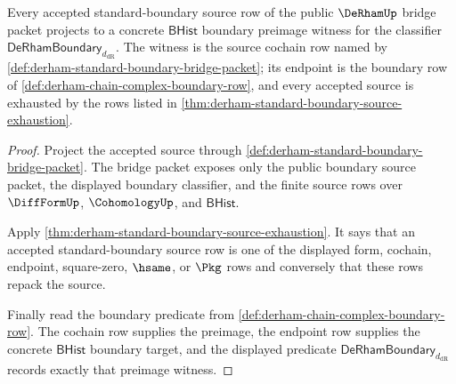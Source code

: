 \begin{theorem}
\label{thm:derham-root-boundary-preimage-threshold}
Every accepted standard-boundary source row of the public $\DeRhamUp$ bridge
packet projects to a concrete $\mathsf{BHist}$ boundary preimage witness for
the classifier $\mathsf{DeRhamBoundary}_{d_{\mathrm{dR}}}$. The witness is the
source cochain row named by
\autoref{def:derham-standard-boundary-bridge-packet}; its endpoint is the
boundary row of \autoref{def:derham-chain-complex-boundary-row}, and every
accepted source is exhausted by the rows listed in
\autoref{thm:derham-standard-boundary-source-exhaustion}.
\end{theorem}
\begin{proof}
Project the accepted source through
\autoref{def:derham-standard-boundary-bridge-packet}. The bridge packet exposes
only the public boundary source packet, the displayed boundary classifier, and
the finite source rows over $\DiffFormUp$, $\CohomologyUp$, and
$\mathsf{BHist}$.

Apply \autoref{thm:derham-standard-boundary-source-exhaustion}. It says that an
accepted standard-boundary source row is one of the displayed form, cochain,
endpoint, square-zero, $\hsame$, or $\Pkg$ rows and conversely that these rows
repack the source.

Finally read the boundary predicate from
\autoref{def:derham-chain-complex-boundary-row}. The cochain row supplies the
preimage, the endpoint row supplies the concrete $\mathsf{BHist}$ boundary
target, and the displayed predicate
$\mathsf{DeRhamBoundary}_{d_{\mathrm{dR}}}$ records exactly that preimage
witness.
\end{proof}

